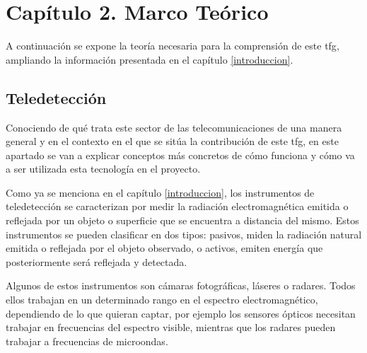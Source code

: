 

\chapter{Capítulo 2. Marco Teórico}
\label{marcoteorico}
\par A continuación se expone la teoría necesaria para la comprensión de este \gls{tfg}, ampliando la información presentada en el capítulo \ref{introduccion}.

\section{Teledetección}
\par Conociendo de qué trata este sector de las telecomunicaciones de una manera general y en el contexto en el que se sitúa la contribución de este \gls{tfg}, en este apartado se van a explicar conceptos más concretos de cómo funciona y cómo va a ser utilizada esta tecnología en el proyecto. 
\\
\par Como ya se menciona en el capítulo \ref{introduccion}, los instrumentos de teledetección se caracterizan por medir la radiación electromagnética emitida o reflejada por un objeto o superficie que se encuentra a distancia del mismo. Estos instrumentos se pueden clasificar en dos tipos: pasivos, miden la radiación natural emitida o reflejada por el objeto observado, o activos, emiten energía que posteriormente será reflejada y detectada.
\\
\par Algunos de estos instrumentos son cámaras fotográficas, láseres o radares. Todos ellos trabajan en un determinado rango en el espectro electromagnético, dependiendo de lo que quieran captar, por ejemplo los sensores ópticos necesitan trabajar en frecuencias del espectro visible, mientras que los radares pueden trabajar a frecuencias de microondas.
